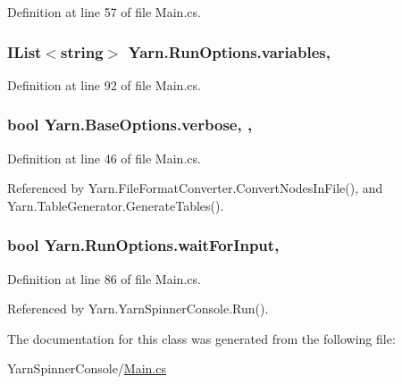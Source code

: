 Definition at line 57 of file Main.\-cs.

\hypertarget{a00142_a2222c73ce5366b02490c6123b711f596}{
\subsubsection[{variables}]{\setlength{\rightskip}{0pt plus 5cm}I\-List$<$string$>$ Yarn.\-Run\-Options.\-variables\hspace{0.3cm}{\ttfamily [get]}, {\ttfamily [set]}}}\label{a00142_a2222c73ce5366b02490c6123b711f596}


Definition at line 92 of file Main.\-cs.

\hypertarget{a00040_ada4d83d1756918f362d55f6649b82b17}{
\subsubsection[{verbose}]{\setlength{\rightskip}{0pt plus 5cm}bool Yarn.\-Base\-Options.\-verbose\hspace{0.3cm}{\ttfamily [get]}, {\ttfamily [set]}, {\ttfamily [inherited]}}}\label{a00040_ada4d83d1756918f362d55f6649b82b17}


Definition at line 46 of file Main.\-cs.



Referenced by Yarn.\-File\-Format\-Converter.\-Convert\-Nodes\-In\-File(), and Yarn.\-Table\-Generator.\-Generate\-Tables().

\hypertarget{a00142_a4b385e83338d14947c4d840d2d1ee266}{
\subsubsection[{wait\-For\-Input}]{\setlength{\rightskip}{0pt plus 5cm}bool Yarn.\-Run\-Options.\-wait\-For\-Input\hspace{0.3cm}{\ttfamily [get]}, {\ttfamily [set]}}}\label{a00142_a4b385e83338d14947c4d840d2d1ee266}


Definition at line 86 of file Main.\-cs.



Referenced by Yarn.\-Yarn\-Spinner\-Console.\-Run().



The documentation for this class was generated from the following file\-:\begin{DoxyCompactItemize}
\item 
Yarn\-Spinner\-Console/\hyperlink{a00300}{Main.\-cs}\end{DoxyCompactItemize}
